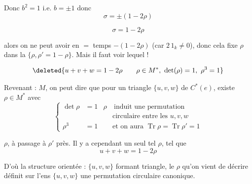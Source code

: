 Donc $b^2=1$ i.e. $b=\pm1$ donc
\[
 \sigma=\pm(1-2\rho)
\]

\[
 \sigma=1-2\rho
\]

alors on ne peut avoir en $=$ temps $-(1-2\rho)$ (car $2\,1_k\ne0$), donc cela fixe $\rho$ dans la  $\{\rho,\rho'=1-\rho\}$. Mais il faut voir lequel ! 

\[
 \deleted{u+v+w=1-2\rho\qquad \rho\in M^*,\ \det(\rho)=1,\ \rho^3=1}
\]

Revenant : $M$, on peut dire que pour un triangle $\{u,v,w\}$ de $C^*(e)$, existe $\rho\in M^*$ avec
\[
 \left\{\begin{aligned}
 \det\rho&=1&\rho&\ \text{induit une permutation}\\
 &&&\text{circulaire entre les }u,v,w\\
 \rho^3&=1&&\text{et on aura }\operatorname{Tr}\rho=\operatorname{Tr}\rho'=1
 \end{aligned}\right.
\]


 $\rho$, à passage à $\rho'$ près. Il y a cependant un seul tel $\rho$, tel que
\[
 \boxed{u+v+w=1-2\rho}
\]

D'où la structure  orientée :  $\{u,v,w\}$ formant triangle,  le $\rho$ qu'on vient de décrire définit sur l'ens $\{u,v,w\}$ une permutation circulaire canonique.

